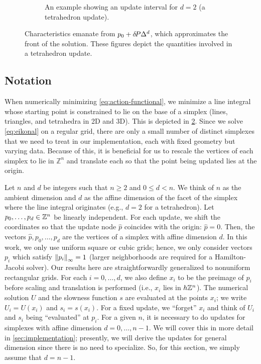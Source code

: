\documentclass{article}
\begin{document}
\begin{figure}
\begin{subfigure}{.44\textwidth}
    \caption{An example showing an update interval for $d = 2$ (a
      tetrahedron update).}\label{fig:tetra-diagram}
  \end{subfigure}
  \caption{Characteristics emanate from $p_0 + {\delta \hspace{-0.14em} P} \Delta^d$, which
    approximates the front of the solution. These figures depict the
    quantities involved in a tetrahedron
    update.}\label{fig:simplex-diagrams}
\end{figure}

\subsection{Notation}\label{ssec:notation}

When numerically minimizing \cref{eq:action-functional}, we minimize a
line integral whose starting point is constrained to lie on the base
of a simplex (lines, triangles, and tetrahedra in 2D and 3D). This is
depicted in \cref{fig:simplex-diagrams}. Since we solve
\cref{eq:eikonal} on a regular grid, there are only a small number of
distinct simplexes that we need to treat in our implementation, each
with fixed geometry but varying data. Because of this, it is
beneficial for us to rescale the vertices of each simplex to lie in
$\mathbb{Z}^n$ and translate each so that the point being updated lies
at the origin.

Let $n$ and $d$ be integers such that $n \geq 2$ and $0 \leq d <
n$. We think of $n$ as the ambient dimension and $d$ as the affine
dimension of the facet of the simplex where the line integral
originates (e.g., $d = 2$ for a tetrahedron). Let
$p_0, \hdots, p_d \in \mathbb{Z}^n$ be linearly independent. For each update,
we shift the coordinates so that the update node $\hat{p}$ coincides
with the origin: $\hat{p} = 0$. Then, the vectors
$\hat{p}, p_0, \hdots, p_d$ are the vertices of a simplex with affine
dimension $d$. In this work, we only use uniform square or cubic
grids; hence, we only consider vectors $p_i$ which satisfy
$\left\|p_i\right\|_\infty = 1$ (larger neighborhoods are required for a
Hamilton-Jacobi solver). Our results here are straightforwardly
generalized to nonuniform rectangular grids. For each
$i = 0, \hdots, d$, we also define $x_i$ to be the preimage of $p_i$
before scaling and translation is performed (i.e., $x_i$ lies in
$h \mathbb{Z}^n$). The numerical solution $U$ and the slowness function $s$
are evaluated at the points $x_i$; we write $U_i = U(x_i)$ and
$s_i = s(x_i)$. For a fixed update, we ``forget'' $x_i$ and think of
$U_i$ and $s_i$ being ``evaluated'' at $p_i$. For a given $n$, it is
necessary to do updates for simplexes with affine dimension
$d = 0, \hdots, n - 1$. We will cover this in more detail in
\cref{sec:implementation}; presently, we will derive the updates for
general dimension since there is no need to specialize. So, for this
section, we simply assume that $d = n - 1$.
\end{document}
